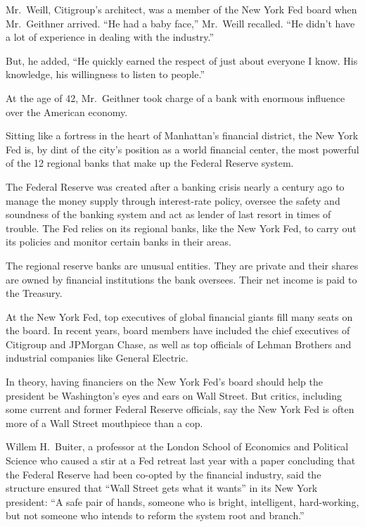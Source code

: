 \documentclass[12pt,a4paper,onecolumn]{article}
\begin{document}
Mr.~Weill, Citigroup's architect, was a member of the New York Fed board when Mr.~Geithner arrived.
``He had a baby face,'' Mr.~Weill recalled. ``He didn't have a lot of experience in dealing with the
industry.''

But, he added, ``He quickly earned the respect of just about everyone I know. His knowledge, his
willingness to listen to people.''

At the age of 42, Mr.~Geithner took charge of a bank with enormous influence over the American
economy.

Sitting like a fortress in the heart of Manhattan's financial district, the New York Fed is, by dint
of the city's position as a world financial center, the most powerful of the 12 regional banks that
make up the Federal Reserve system.

The Federal Reserve was created after a banking crisis nearly a century ago to manage the money
supply through interest-rate policy, oversee the safety and soundness of the banking system and act
as lender of last resort in times of trouble. The Fed relies on its regional banks, like the New
York Fed, to carry out its policies and monitor certain banks in their areas.

The regional reserve banks are unusual entities. They are private and their shares are owned by
financial institutions the bank oversees. Their net income is paid to the Treasury.

At the New York Fed, top executives of global financial giants fill many seats on the board. In
recent years, board members have included the chief executives of Citigroup and JPMorgan Chase, as
well as top officials of Lehman Brothers and industrial companies like General Electric.

In theory, having financiers on the New York Fed's board should help the president be Washington's
eyes and ears on Wall Street. But critics, including some current and former Federal Reserve
officials, say the New York Fed is often more of a Wall Street mouthpiece than a cop.

Willem H.~Buiter, a professor at the London School of Economics and Political Science who caused a
stir at a Fed retreat last year with a paper concluding that the Federal Reserve had been co-opted
by the financial industry, said the structure ensured that ``Wall Street gets what it wants'' in its
New York president: ``A safe pair of hands, someone who is bright, intelligent, hard-working, but
not someone who intends to reform the system root and branch.''
\end{document}
